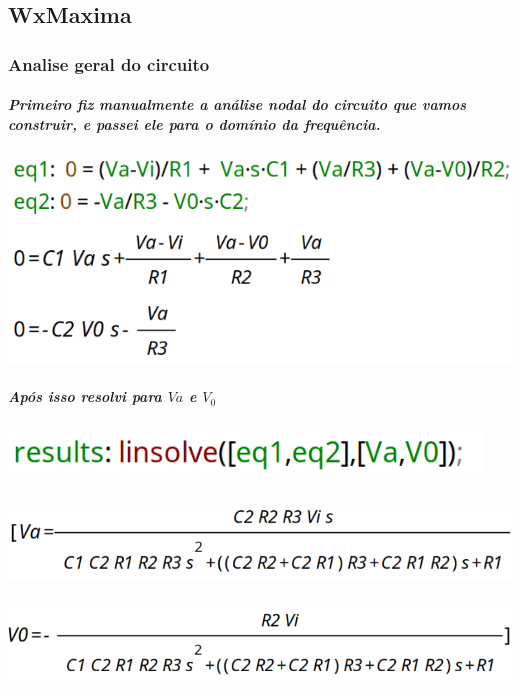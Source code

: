 \documentclass[12pt,twoside, a4paper, twocolumn]{article}
\begin{document}
\subsection{WxMaxima}

\subsubsection{Analise geral do circuito}


\subparagraph*{Primeiro fiz manualmente a análise nodal do circuito que vamos construir, e passei ele para o domínio da frequência.}
\subparagraph*{}


\begin{adjustbox}{scale=0.4}
    \includegraphics{eqs.png}
\end{adjustbox}


\subparagraph*{Após isso resolvi para $Va$ e $V_0$}


\subparagraph*{}


\begin{adjustbox}{scale=0.4}
    \includegraphics{linsolve.png}
\end{adjustbox}

\subparagraph*{}

\begin{adjustbox}{scale=0.4}
    \includegraphics{va.png}
\end{adjustbox}

\subparagraph*{}

\begin{adjustbox}{scale=0.4}
    \includegraphics{v0.png}
\end{adjustbox}
\end{document}
